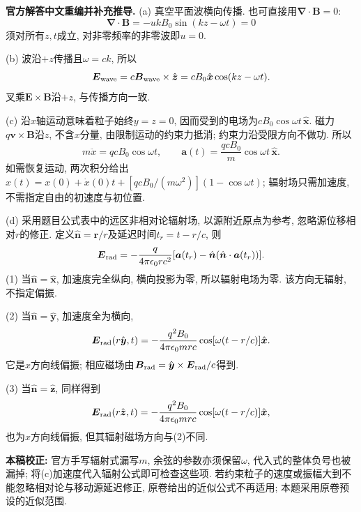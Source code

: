 \begin{solution}
\textbf{官方解答中文重编并补充推导.}
(a) 真空平面波横向传播. 也可直接用$\boldsymbol\nabla\cdot\boldsymbol B=0$:
\[
\boldsymbol\nabla\cdot\boldsymbol B=-u k B_0\sin(kz-\omega t)=0
\]
须对所有$z,t$成立, 对非零频率的非零波即$u=0$.

(b) 波沿$+z$传播且$\omega=ck$, 所以
\[
\boldsymbol E_{\rm wave}=c\boldsymbol B_{\rm wave}\times\hat{\boldsymbol z}
=cB_0\hat{\boldsymbol x}\cos(kz-\omega t).
\]
叉乘$\boldsymbol E\times\boldsymbol B$沿$+z$, 与传播方向一致.

(c) 沿$x$轴运动意味着粒子始终$y=z=0$, 因而受到的电场为$cB_0\cos\omega t\,\hat{\boldsymbol x}$. 磁力$q\boldsymbol v\times\boldsymbol B$沿$z$, 不含$x$分量, 由限制运动的约束力抵消; 约束力沿受限方向不做功. 所以
\[
m\ddot x=qcB_0\cos\omega t,\qquad
\boldsymbol a(t)=\frac{qcB_0}{m}\cos\omega t\,\hat{\boldsymbol x}.
\]
如需恢复运动, 两次积分给出$x(t)=x(0)+\dot x(0)t+[qcB_0/(m\omega^2)](1-\cos\omega t)$; 辐射场只需加速度, 不需指定自由的初速度与初位置.

(d) 采用题目公式表中的远区非相对论辐射场, 以源附近原点为参考, 忽略源位移相对$r$的修正. 定义$\hat{\boldsymbol n}=\boldsymbol r/r$及延迟时间$t_r=t-r/c$, 则
\[
\boldsymbol E_{\rm rad}=-\frac q{4\pi\epsilon_0rc^2}
[\boldsymbol a(t_r)-\hat{\boldsymbol n}(\hat{\boldsymbol n}\cdot\boldsymbol a(t_r))].
\]
(1) 当$\hat{\boldsymbol n}=\hat{\boldsymbol x}$, 加速度完全纵向, 横向投影为零, 所以辐射电场为零. 该方向无辐射, 不指定偏振.

(2) 当$\hat{\boldsymbol n}=\hat{\boldsymbol y}$, 加速度全为横向,
\[
\boldsymbol E_{\rm rad}(r\hat{\boldsymbol y},t)
=-\frac{q^2B_0}{4\pi\epsilon_0mrc}\cos[\omega(t-r/c)]\hat{\boldsymbol x}.
\]
它是$x$方向线偏振; 相应磁场由$\boldsymbol B_{\rm rad}=\hat{\boldsymbol y}\times\boldsymbol E_{\rm rad}/c$得到.

(3) 当$\hat{\boldsymbol n}=\hat{\boldsymbol z}$, 同样得到
\[
\boldsymbol E_{\rm rad}(r\hat{\boldsymbol z},t)
=-\frac{q^2B_0}{4\pi\epsilon_0mrc}\cos[\omega(t-r/c)]\hat{\boldsymbol x},
\]
也为$x$方向线偏振, 但其辐射磁场方向与(2)不同.

\textbf{本稿校正:} 官方手写辐射式漏写$m$, 余弦的参数亦须保留$\omega$, 代入式的整体负号也被漏掉; 将(c)加速度代入辐射公式即可检查这些项. 若约束粒子的速度或振幅大到不能忽略相对论与移动源延迟修正, 原卷给出的近似公式不再适用; 本题采用原卷预设的近似范围.
\end{solution}

